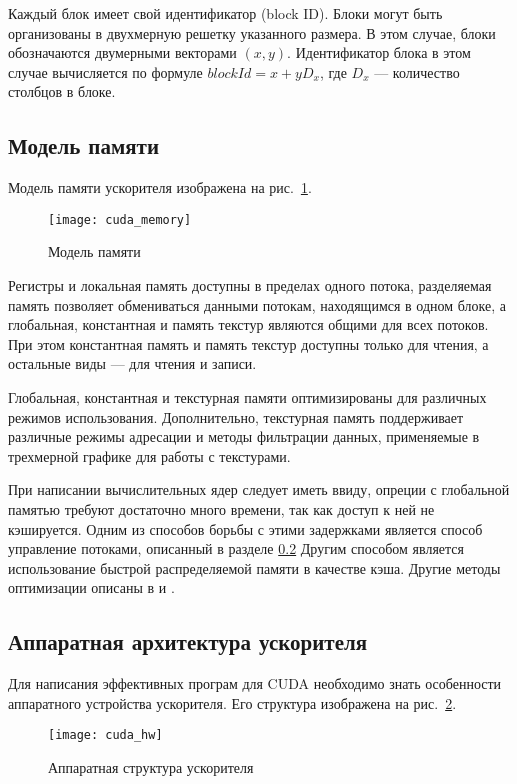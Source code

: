Каждый блок имеет свой идентификатор (block ID). Блоки могут быть организованы в двухмерную решетку указанного размера. В этом случае, блоки обозначаются двумерными векторами $(x, y)$. Идентификатор блока в этом случае вычисляется по формуле $blockId = x + yD_x$, где $D_x$ --- количество столбцов в блоке.

\subsection{Модель памяти}
\label{c:mem_model}
Модель памяти ускорителя изображена на рис.~\ref{fig:cuda_memory}.

\begin{figure}[ht]
\center
\texttt{[image: cuda\_memory]}
\caption{Модель памяти}
\label{fig:cuda_memory}
\end{figure}

Регистры и локальная память доступны в пределах одного потока, разделяемая память позволяет обмениваться данными потокам, находящимся в одном блоке, а глобальная, константная и память текстур являются общими для всех потоков. При этом константная память и память текстур доступны только для чтения, а остальные виды --- для чтения и записи.

Глобальная, константная и текстурная памяти оптимизированы для различных режимов использования. Дополнительно, текстурная память поддерживает различные режимы адресации и методы фильтрации данных, применяемые в трехмерной графике для работы с текстурами.

При написании вычислительных ядер следует иметь ввиду, опреции с глобальной памятью требуют достаточно много времени, так как доступ к ней не кэшируется. Одним из способов борьбы с этими задержками является способ управление потоками, описанный в разделе \ref{c:cuda_hw} Другим способом является использование быстрой распределяемой памяти в качестве кэша. Другие методы оптимизации описаны в \cite{cuda_struct_alg} и \cite{cuda_optim}.

\subsection{Аппаратная архитектура ускорителя}
\label{c:cuda_hw}

Для написания эффективных програм для CUDA необходимо знать особенности аппаратного устройства ускорителя. Его структура изображена на рис.~\ref{fig:cuda_hw}.

\begin{figure}[ht]
\center
\texttt{[image: cuda\_hw]}
\caption{Аппаратная структура ускорителя}
\label{fig:cuda_hw}
\end{figure}

